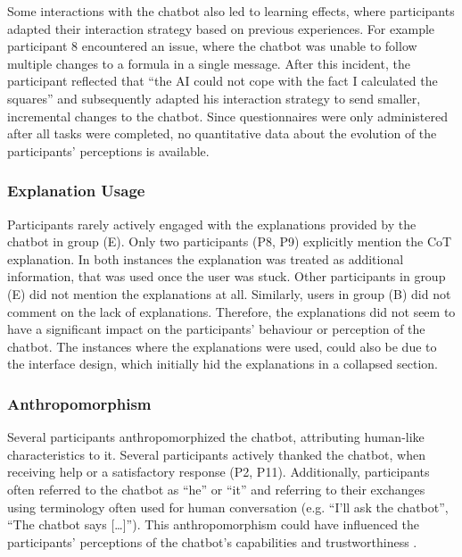 Some interactions with the chatbot also led to learning effects, where participants adapted their interaction strategy based on previous experiences. For example participant 8 encountered an issue, where the chatbot was unable to follow multiple changes to a formula in a single message. After this incident, the participant reflected that “the AI could not cope with the fact I calculated the squares” and subsequently adapted his interaction strategy to send smaller, incremental changes to the chatbot. Since questionnaires were only administered after all tasks were completed, no quantitative data about the evolution of the participants' perceptions is available.

\subsubsection{Explanation Usage} \label{sssec:explanation_usage}

Participants rarely actively engaged with the explanations provided by the chatbot in group (E). Only two participants (P8, P9) explicitly mention the \ac{CoT} explanation. In both instances the explanation was treated as additional information, that was used once the user was stuck. Other participants in group (E) did not mention the explanations at all. Similarly, users in group (B) did not comment on the lack of explanations. Therefore, the explanations did not seem to have a significant impact on the participants' behaviour or perception of the chatbot. The instances where the explanations were used, could also be due to the interface design, which initially hid the explanations in a collapsed section.

\subsubsection{Anthropomorphism} \label{sssec:anthropomorphism}

Several participants anthropomorphized the chatbot, attributing human-like characteristics to it. Several participants actively thanked the chatbot, when receiving help or a satisfactory response (P2, P11). Additionally, participants often referred to the chatbot as “he” or “it” and referring to their exchanges using terminology often used for human conversation (e.g. “I'll ask the chatbot”, “The chatbot says [\dots]”). This anthropomorphism could have influenced the participants' perceptions of the chatbot's capabilities and trustworthiness \parencite{Li2022}.

